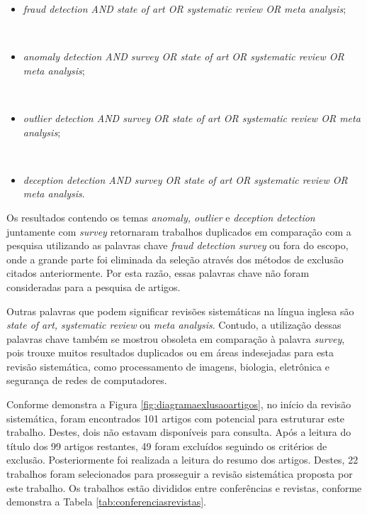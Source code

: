 \documentclass[smallextended]{svjour3}
\begin{document}
\begin{itemize}
	\item \emph{fraud detection AND state of art OR systematic review OR meta analysis};
	
	\
	\item \emph{anomaly detection AND survey OR state of art OR systematic review OR meta analysis};
	
	\
	\item \emph{outlier detection AND survey OR state of art OR systematic review OR meta analysis}; 	
	
	\
	\item \emph{deception detection AND survey OR state of art OR systematic review OR meta analysis}.
\end{itemize}

Os resultados contendo os temas \emph{anomaly, outlier} e \emph{deception detection} juntamente com \emph{survey} retornaram trabalhos duplicados em comparação com a pesquisa utilizando as palavras chave \emph{fraud detection survey} ou fora do escopo, onde a grande parte foi eliminada da seleção através dos métodos de exclusão citados anteriormente. Por esta razão, essas palavras chave não foram consideradas para a pesquisa de artigos.

Outras palavras que podem significar revisões sistemáticas na língua inglesa são \emph{state of art, systematic review} ou \emph{meta analysis}. Contudo, a utilização dessas palavras chave também se mostrou obsoleta em comparação à palavra \emph{survey}, pois trouxe muitos resultados duplicados ou em áreas indesejadas para esta revisão sistemática, como processamento de imagens, biologia, eletrônica e segurança de redes de computadores.

Conforme demonstra a Figura \ref{fig:diagramaexlusaoartigos}, no início da revisão sistemática, foram encontrados 101 artigos com potencial para estruturar este trabalho. Destes, dois não estavam disponíveis para consulta. Após a leitura do título dos 99 artigos restantes, 49 foram excluídos seguindo os critérios de exclusão. Posteriormente foi realizada a leitura do resumo dos artigos. Destes, 22 trabalhos foram selecionados para prosseguir a revisão sistemática proposta por este trabalho. Os trabalhos estão divididos entre conferências e revistas, conforme demonstra a Tabela \ref{tab:conferenciasrevistas}.
\end{document}
